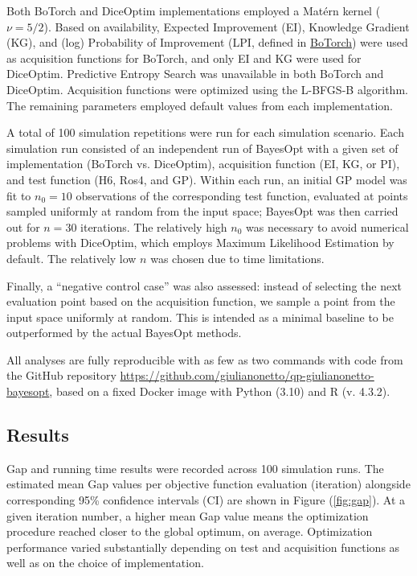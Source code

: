 Both BoTorch and DiceOptim implementations employed a Matérn kernel ($\nu=5/2$). Based 
on availability, Expected Improvement (EI), Knowledge Gradient (KG), and (log) Probability of Improvement (LPI, defined in \href{https://botorch.org/api/acquisition.html\#botorch.acquisition.analytic.LogProbabilityOfImprovement}{BoTorch}) were used as acquisition functions for BoTorch, and only EI and KG were used for DiceOptim. Predictive Entropy Search was unavailable in both BoTorch and DiceOptim. Acquisition functions were optimized using the L-BFGS-B algorithm. The remaining parameters employed default values from each implementation.

A total of 100 simulation repetitions were run for each simulation scenario. Each simulation run consisted of an independent run of BayesOpt with a given set of implementation (BoTorch vs. DiceOptim), acquisition function (EI, KG, or PI), and test function (H6, Ros4, and GP). Within each run, an initial GP model was fit to $n_0=10$ observations of the corresponding test function, evaluated at points sampled uniformly at random from the input space; BayesOpt was then carried out for $n=30$ iterations. The relatively high $n_0$ was necessary to avoid numerical problems with DiceOptim, which employs Maximum Likelihood Estimation by default. The relatively low $n$ was chosen due to time limitations.

Finally, a ``negative control case'' was also assessed: instead of selecting the next evaluation point based on the acquisition function, we sample a point from the input space uniformly at random. This is intended as a minimal baseline to be outperformed by the actual BayesOpt methods.

All analyses are fully reproducible with as few as two commands with code from the GitHub repository \href{https://github.com/giulianonetto/qp-giulianonetto-bayesopt}{https://github.com/giulianonetto/qp-giulianonetto-bayesopt}, based on a fixed Docker image \cite{merkel2014} with Python (3.10) and R (v. 4.3.2).
\subsection{Results}
Gap and running time results were recorded across 100 simulation runs. The estimated mean Gap values per objective function evaluation (iteration) alongside corresponding 95\% confidence intervals (CI) are shown in Figure (\ref{fig:gap}). At a given iteration number, a higher mean Gap value means the optimization procedure reached closer to the global optimum, on average. Optimization performance varied substantially depending on test and acquisition functions as well as on the choice of implementation.

